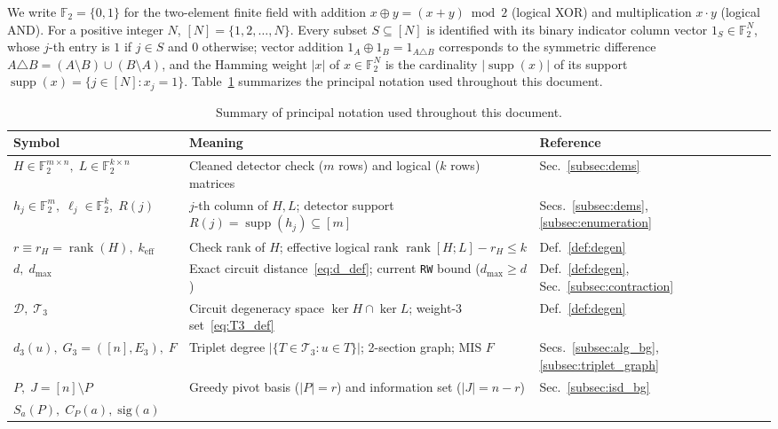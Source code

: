 \documentclass[12pt]{article}
\theoremstyle{definition}
\newcommand{\Ftwo}{\mathbb{F}_2}
\DeclareMathOperator{\supp}{supp}
\DeclareMathOperator{\rank}{rank}
\newcommand{\Dc}{\mathcal{D}}
\newcommand{\Tc}{\mathcal{T}_3}
\newcommand{\ttt}[1]{\texttt{#1}}
\begin{document}
We write $\Ftwo = \{0, 1\}$ for the two-element finite field with addition $x \oplus y = (x + y) \bmod 2$ (logical
XOR) and multiplication $x \cdot y$ (logical AND). For a positive integer $N$, $[N] = \{1, 2, \dots, N\}$. Every
subset $S \subseteq [N]$ is identified with its binary indicator column vector $1_S \in \Ftwo^N$, whose $j$-th
entry is $1$ if $j \in S$ and $0$ otherwise; vector addition $1_A \oplus 1_B = 1_{A \triangle B}$ corresponds to
the symmetric difference $A \triangle B = (A \setminus B) \cup (B \setminus A)$, and the Hamming weight $|x|$ of
$x \in \Ftwo^N$ is the cardinality $|\supp(x)|$ of its support $\supp(x) = \{j \in [N] : x_j = 1\}$.
Table~\ref{tab:notation} summarizes the principal notation used throughout this document.

\begin{table}[htbp]
\centering
\caption{Summary of principal notation used throughout this document.}\label{tab:notation}
\smallskip
\footnotesize
\setlength{\tabcolsep}{4.0pt}
\begin{tabular}{@{}p{}>{\raggedright\arraybackslash}p{}l@{}}
\toprule
Symbol & Meaning & Reference \\
\midrule
$H \in \Ftwo^{m \times n},\; L \in \Ftwo^{k \times n}$ &
  Cleaned detector check ($m$ rows) and logical ($k$ rows) matrices & Sec.~\ref{subsec:dems} \\
$h_j \in \Ftwo^m,\; \ell_j \in \Ftwo^k,\; R(j)$ &
  $j$-th column of $H, L$; detector support $R(j) = \supp(h_j) \subseteq [m]$ &
  Secs.~\ref{subsec:dems}, \ref{subsec:enumeration} \\
$r \equiv r_H = \rank(H),\; k_{\mathrm{eff}}$ &
  Check rank of $H$; effective logical rank $\rank[H; L] - r_H \le k$ & Def.~\ref{def:degen} \\
$d,\; d_{\max}$ &
  Exact circuit distance~\eqref{eq:d_def}; current \ttt{RW} bound ($d_{\max} \ge d$) &
  Def.~\ref{def:degen}, Sec.~\ref{subsec:contraction} \\
$\Dc,\; \Tc$ &
  Circuit degeneracy space $\ker H \cap \ker L$; weight-3 set~\eqref{eq:T3_def} & Def.~\ref{def:degen} \\
$d_3(u),\; G_3 = ([n], E_3),\; F$ &
  Triplet degree $|\{T \in \Tc : u \in T\}|$; 2-section graph; MIS $F$ &
  Secs.~\ref{subsec:alg_bg}, \ref{subsec:triplet_graph} \\
$P,\; J = [n] \setminus P$ &
  Greedy pivot basis ($|P| = r$) and information set ($|J| = n - r$) & Sec.~\ref{subsec:isd_bg} \\
$S_a(P),\; C_P(a),\; \mathrm{sig}(a)$ &

\end{tabular}
\end{table}
\end{document}
